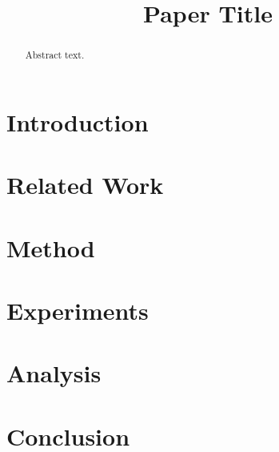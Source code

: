 \documentclass[11pt]{article}
\title{Paper Title}
\author{}
\date{}
\begin{document}
\maketitle

\begin{abstract}
Abstract text.
\end{abstract}

\section{Introduction}

\section{Related Work}

\section{Method}

\section{Experiments}

\section{Analysis}

\section{Conclusion}


\end{document}
